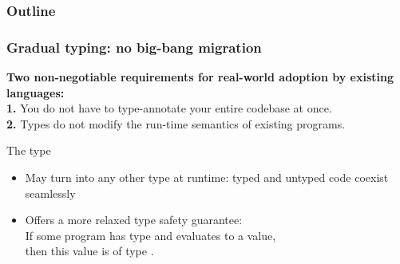 
\begin{frame}
\frametitle{Outline} 
\tableofcontents[currentsection]
\end{frame}

\begin{frame}
\frametitle{Gradual typing: no big-bang migration}
\textbf{\color{darkslateblue}Two non-negotiable requirements for real-world adoption by existing languages:}\\
\textbf{\hspace*{.4mm}1.} You do not have to type-annotate your entire codebase at once.\\
\textbf{2.} Types do not modify the run-time semantics of existing programs.

\medskip

\begin{block}{The  type}
\begin{itemize}
\setlength{\itemsep}{-0pt}
\item May turn into any other type at runtime: typed and untyped code coexist
      seamlessly
\item Offers a more relaxed type safety guarantee:\\
 If some program  has type  and evaluates to a value, \\
      then this value is of type .
\end{itemize}
\end{block}

\end{frame}

